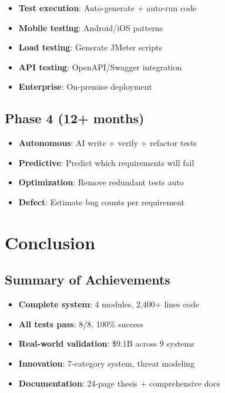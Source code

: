 \documentclass[12pt,a4paper]{report}
\begin{document}
\begin{itemize}
    \item \textbf{Test execution}: Auto-generate + auto-run code
    \item \textbf{Mobile testing}: Android/iOS patterns
    \item \textbf{Load testing}: Generate JMeter scripts
    \item \textbf{API testing}: OpenAPI/Swagger integration
    \item \textbf{Enterprise}: On-premise deployment
\end{itemize}

\section{Phase 4 (12+ months)}

\begin{itemize}
    \item \textbf{Autonomous}: AI write + verify + refactor tests
    \item \textbf{Predictive}: Predict which requirements will fail
    \item \textbf{Optimization}: Remove redundant tests auto
    \item \textbf{Defect}: Estimate bug counts per requirement
\end{itemize}

\chapter{Conclusion}

\section{Summary of Achievements}

\begin{itemize}
    \item \checkmark \textbf{Complete system}: 4 modules, 2,400+ lines code
    \item \checkmark \textbf{All tests pass}: 8/8, 100\% success
    \item \checkmark \textbf{Real-world validation}: \$9.1B across 9 systems
    \item \checkmark \textbf{Innovation}: 7-category system, threat modeling
    \item \checkmark \textbf{Documentation}: 24-page thesis + comprehensive docs
\end{itemize}
\end{document}
